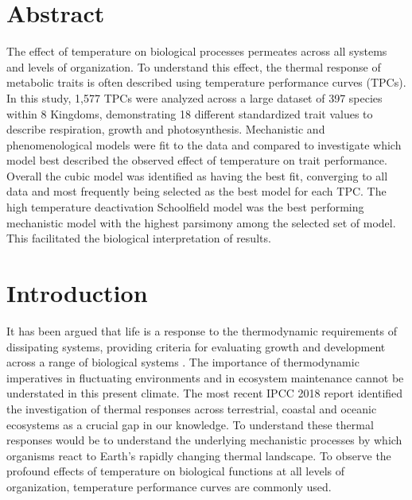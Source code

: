\documentclass[11pt]{article}
\begin{document}
\tableofcontents
\newpage
\begin{linenumbers}
\section{Abstract}
The effect of temperature on biological processes permeates across all systems and levels of organization. To understand this effect, the thermal response of metabolic traits is often described using temperature performance curves (TPCs). In this study, 1,577 TPCs were analyzed across a large dataset of 397 species within 8 Kingdoms, demonstrating 18 different standardized trait values to describe respiration, growth and photosynthesis. Mechanistic and phenomenological models were fit to the data and compared to investigate which model best described the observed effect of temperature on trait performance. Overall the cubic model was identified as having the best fit, converging to all data and most frequently being selected as the best model for each TPC. The high temperature deactivation Schoolfield model was the best performing mechanistic model with the highest parsimony among the selected set of model. This facilitated the biological interpretation of results.


\section{Introduction}
It has been argued that life is a response to the thermodynamic requirements of dissipating systems, providing criteria for evaluating growth and development across a range of biological systems \cite{Schneider2007OrderFD}. The importance of thermodynamic imperatives in fluctuating environments and in ecosystem maintenance cannot be understated in this present climate. The most recent IPCC 2018 report \cite{IPCC2018} identified the investigation of thermal responses across terrestrial, coastal and oceanic ecosystems as a crucial gap in our knowledge. To understand these thermal responses would be to understand the underlying mechanistic processes by which organisms react to Earth's rapidly changing thermal landscape. To observe the profound effects of temperature on biological functions at all levels of organization, temperature performance curves are commonly used.


\end{linenumbers}
\end{document}
